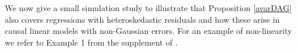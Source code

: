 \documentclass[11pt,a4paper]{article}
\newtheorem{Lemma}[Satz]{Lemma}
\theoremstyle{definition}
\theoremstyle{remark}
\newcommand{\g}[1][G]{\mathcal{#1}}
\newcommand{\vsp}{\vspace{.2cm}}
\begin{document}

\vsp

We now give a small simulation study to illustrate that Proposition \ref{avarDAG} also covers regressions with heteroskedastic residuals and how these arise in causal linear models with non-Gaussian errors. For an example of non-linearity we refer to Example 1 from the supplement of \citet[][]{nandy2017estimating}.
\end{document}
